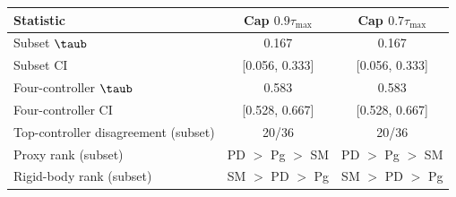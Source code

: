 \begin{tabular}{lcc}
\toprule
Statistic & Cap $0.9\tau_{\max}$ & Cap $0.7\tau_{\max}$ \\
\midrule
Subset $\taub$                         & 0.167 & 0.167 \\
Subset CI                              & [0.056, 0.333] & [0.056, 0.333] \\
Four-controller $\taub$                & 0.583 & 0.583 \\
Four-controller CI                     & [0.528, 0.667] & [0.528, 0.667] \\
Top-controller disagreement (subset)   & 20/36 & 20/36 \\
Proxy rank (subset)                    & PD $>$ Pg $>$ SM & PD $>$ Pg $>$ SM \\
Rigid-body rank (subset)               & SM $>$ PD $>$ Pg & SM $>$ PD $>$ Pg \\
\bottomrule
\end{tabular}

